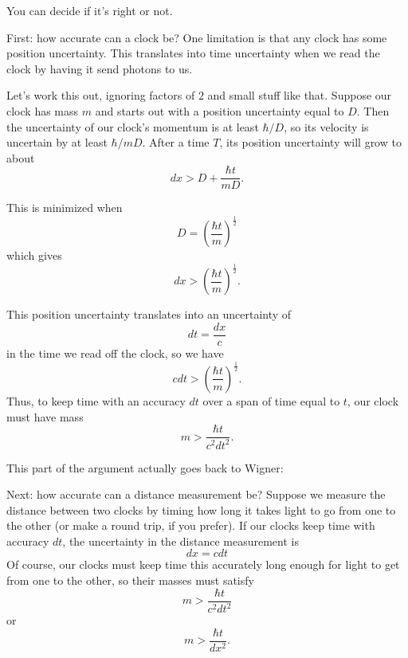 \documentclass{article}
\def\tightlist{}
\renewcommand{\texttt}[1]{%
  \begingroup
  \ttfamily
  \begingroup\lccode`~=`/\lowercase{\endgroup\def~}{/\discretionary{}{}{}}%
  \begingroup\lccode`~=`[\lowercase{\endgroup\def~}{[\discretionary{}{}{}}%
  \begingroup\lccode`~=`.\lowercase{\endgroup\def~}{.\discretionary{}{}{}}%
  \catcode`/=\active\catcode`[=\active\catcode`.=\active
  \scantokens{#1\noexpand}%
  \endgroup
}
\begin{document}

You can decide if it's right or not.

First: how accurate can a clock be? One limitation is that any clock has
some position uncertainty. This translates into time uncertainty when we
read the clock by having it send photons to us.

Let's work this out, ignoring factors of \(2\) and small stuff like
that. Suppose our clock has mass \(m\) and starts out with a position
uncertainty equal to \(D\). Then the uncertainty of our clock's momentum
is at least \(\hbar/D\), so its velocity is uncertain by at least
\(\hbar/mD\). After a time \(T\), its position uncertainty will grow to
about \[dx > D + \frac{\hbar t}{mD}.\]

This is minimized when \[D = \left(\frac{\hbar t}{m}\right)^{\frac12}\]
which gives \[dx > \left(\frac{\hbar t}{m}\right)^{\frac12}.\]

This position uncertainty translates into an uncertainty of
\[dt = \frac{dx}{c}\] in the time we read off the clock, so we have
\[c dt > \left(\frac{\hbar t}{m}\right)^{\frac12}.\] Thus, to keep time
with an accuracy \(dt\) over a span of time equal to \(t\), our clock
must have mass \[m > \frac{\hbar t}{c^2 dt^2}.\]

This part of the argument actually goes back to Wigner:


Next: how accurate can a distance measurement be? Suppose we measure the
distance between two clocks by timing how long it takes light to go from
one to the other (or make a round trip, if you prefer). If our clocks
keep time with accuracy \(dt\), the uncertainty in the distance
measurement is \[dx = c dt\] Of course, our clocks must keep time this
accurately long enough for light to get from one to the other, so their
masses must satisfy \[m > \frac{\hbar t}{c^2 dt^2}\] or
\[m > \frac{\hbar t}{dx^2}.\]
\end{document}
